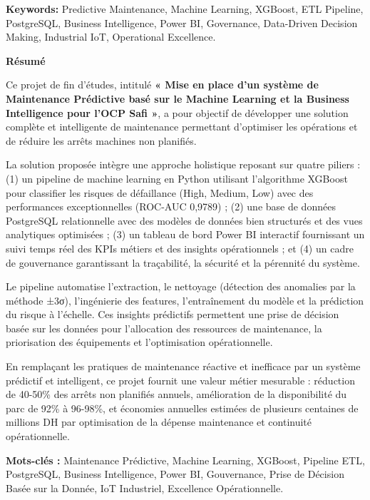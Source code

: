 \documentclass[a4paper,12pt]{report}
\begin{document}
\textbf{Keywords:} Predictive Maintenance, Machine Learning, XGBoost, ETL Pipeline, PostgreSQL, Business Intelligence, Power BI, Governance, Data-Driven Decision Making, Industrial IoT, Operational Excellence.

\newpage
\thispagestyle{empty}
\begin{center}
\Large\textbf{Résumé}
\end{center}

\vspace{2cm}

Ce projet de fin d'études, intitulé \textbf{« Mise en place d'un système de Maintenance Prédictive basé sur le Machine Learning et la Business Intelligence pour l'OCP Safi »}, a pour objectif de développer une solution complète et intelligente de maintenance permettant d'optimiser les opérations et de réduire les arrêts machines non planifiés.

La solution proposée intègre une approche holistique reposant sur quatre piliers : (1) un pipeline de machine learning en Python utilisant l'algorithme XGBoost pour classifier les risques de défaillance (High, Medium, Low) avec des performances exceptionnelles (ROC-AUC 0,9789) ; (2) une base de données PostgreSQL relationnelle avec des modèles de données bien structurés et des vues analytiques optimisées ; (3) un tableau de bord Power BI interactif fournissant un suivi temps réel des KPIs métiers et des insights opérationnels ; et (4) un cadre de gouvernance garantissant la traçabilité, la sécurité et la pérennité du système.

Le pipeline automatise l'extraction, le nettoyage (détection des anomalies par la méthode ±3σ), l'ingénierie des features, l'entraînement du modèle et la prédiction du risque à l'échelle. Ces insights prédictifs permettent une prise de décision basée sur les données pour l'allocation des ressources de maintenance, la priorisation des équipements et l'optimisation opérationnelle.

En remplaçant les pratiques de maintenance réactive et inefficace par un système prédictif et intelligent, ce projet fournit une valeur métier mesurable : réduction de 40-50\% des arrêts non planifiés annuels, amélioration de la disponibilité du parc de 92\% à 96-98\%, et économies annuelles estimées de plusieurs centaines de millions DH par optimisation de la dépense maintenance et continuité opérationnelle.

\textbf{Mots-clés :} Maintenance Prédictive, Machine Learning, XGBoost, Pipeline ETL, PostgreSQL, Business Intelligence, Power BI, Gouvernance, Prise de Décision Basée sur la Donnée, IoT Industriel, Excellence Opérationnelle.
\end{document}
